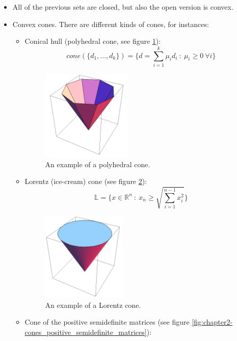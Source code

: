 \begin{itemize}
    \item All of the previous sets are closed, but also the open version is convex.
    \item Convex cones. There are different kinds of cones, for instances:
    \begin{itemize}
        \item Conical hull (polyhedral cone, see figure \ref{fig:chapter2-polyhedral_cone}):
        \begin{equation}
            \textit{cone}(\{d_1,...,d_k\}) = \{d = \sum_{i=1}^k \mu_i d_i\ :\ \mu_i \geq 0\ \forall i\}
        \end{equation}
        \begin{figure}
            \centering
            \includegraphics[scale=0.5]{figures/2/chapter2-polyhedral_cone.png}
            \caption{An example of a polyhedral cone.}
            \label{fig:chapter2-polyhedral_cone}
        \end{figure}
        \item Lorentz (ice-cream) cone (see figure \ref{fig:chapter2-lorentz_cone}):
        \begin{equation}
            \mathbb{L} = \Bigg\{x \in \mathbb{R}^n\ :\ x_n \geq \sqrt{\sum_{i=1}^{n-1} x_i^2}\Bigg\}
        \end{equation}
        \begin{figure}
            \centering
            \includegraphics[scale=0.5]{figures/2/chapter2-lorentz_cone.png}
            \caption{An example of a Lorentz cone.}
            \label{fig:chapter2-lorentz_cone}
        \end{figure}
        \item Cone of the positive semidefinite matrices (see figure \ref{fig:chapter2-cones_positive_semidefinite_matrices}):

\end{itemize}
\end{itemize}
